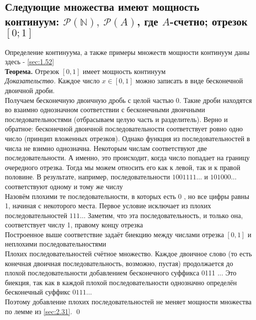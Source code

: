 \documentclass[a4paper]{article}
\begin{document}
\subsection{Следующие множества имеют мощность континуум: $\mathcal{P}(\mathbb{N}),\ \mathcal{P}(A)$, где $A$-счетно; отрезок $[0;1]$}
Определение континуума, а также примеры множеств мощности континуум даны здесь - \ref{sec:1.52}\\[2mm]
\textbf{Теорема.} Отрезок $[0,1]$ имеет мощность континуум\\[2mm]
\textit{Доказательство.} Каждое число $x \in[0,1]$ можно записать в виде бесконечной двоичной дроби.\\[2mm]
 Получаем бесконечную двоичную дробь с целой частью 0. Такие дроби находятся во взаимно однозначном соответствии с бесконечными двоичными последовательностями (отбрасываем целую часть и разделитель). Верно и обратное: бесконечной двоичной последовательности соответствует ровно одно число (принцип вложенных отрезков). Однако функция из последовательностей в числа не взимно однозначна. Некоторым числам соответствуют две последовательности. А именно, это происходит, когда число попадает на границу очередного отрезка. Тогда мы можем относить его как к левой, так и к правой половине. В результате, например, последовательности $1001111 \ldots$ и $101000 \ldots$ соответствуют одному и тому же числу\\[2mm]
 Назовём плохими те последовательности, в которых есть 0 , но все цифры равны 1, начиная с некоторого места. Первое условие исключает из плохих последовательностей $111 \ldots$ Заметим, что эта последовательность, и только она, соответствует числу 1, правому концу отрезка\\[2mm]
 Построенное выше соответствие задаёт биекцию между числами отрезка $[0,1]$ и неплохими последовательностями\\[2mm]
 Плохих последовательностей счётное множество. Каждое двоичное слово (то есть конечная двоичная последовательность, возможно, пустая) продолжается до плохой последовательности добавлением бесконечного суффикса 0111 ... Это биекция, так как в каждой плохой последовательности однозначно определён бесконечный суффикс $0111 \ldots$\\[2mm]
 Поэтому добавление плохих последовательностей не меняет мощности множества по лемме из \ref{sec:2.31}. \qed
\end{document}
